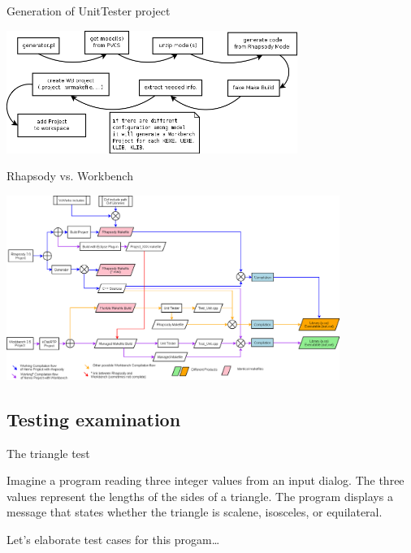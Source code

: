 \documentclass{beamer}
\begin{document}
\begin{frame}{Generation of UnitTester project}
\begin{center}
    \includegraphics[height=4cm]{img/UTProject_generator_toolchain.png}
  \end{center}
\end{frame}

\begin{frame}{Rhapsody vs. Workbench}
\begin{center}
    \includegraphics[height=6cm]{img/RHWB.png}
 \end{center}
\end{frame}

\subsection{Testing examination}

\begin{frame}{The triangle test\cite{Glenford04}}
\begin{definition}
Imagine a program reading three integer values from an input dialog. The
three values represent the lengths of the sides of a triangle. The
program displays a message that states whether the triangle is scalene,
isosceles, or equilateral.
\end{definition}

Let's elaborate test cases for this progam\ldots

\end{frame}
\end{document}
